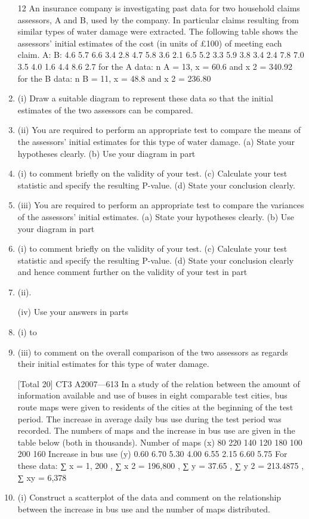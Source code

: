 \documentclass[a4paper,12pt]{article}
\begin{document}
\begin{enumerate}


12
An insurance company is investigating past data for two household claims assessors,
A and B, used by the company. In particular claims resulting from similar types of
water damage were extracted. The following table shows the assessors’ initial
estimates of the cost (in units of £100) of meeting each claim.
A:
B:
4.6
5.7
6.6
3.4
2.8
4.7
5.8
3.6
2.1
6.5
5.2
3.3
5.9
3.8
3.4
2.4
7.8
7.0
3.5
4.0
1.6
4.4
8.6
2.7
for the A data: n A = 13, \sum x = 60.6 and \sum x 2 = 340.92
for the B data: n B = 11, \sum x = 48.8 and \sum x 2 = 236.80
\item (i) Draw a suitable diagram to represent these data so that the initial estimates of
the two assessors can be compared.

\item (ii) You are required to perform an appropriate test to compare the means of the
assessors’ initial estimates for this type of water damage.
(a) State your hypotheses clearly.
(b) Use your diagram in part \item (i) to comment briefly on the validity of your
test.
(c) Calculate your test statistic and specify the resulting P-value.
(d) State your conclusion clearly.
\item (iii)
You are required to perform an appropriate test to compare the variances of
the assessors’ initial estimates.
(a) State your hypotheses clearly.
(b) Use your diagram in part \item (i) to comment briefly on the validity of your
test.
(c) Calculate your test statistic and specify the resulting P-value.
(d) State your conclusion clearly and hence comment further on the validity of your test in part \item (ii).

(iv)
Use your answers in parts \item (i) to \item (iii) to comment on the overall comparison of the two assessors as regards their initial estimates for this type of water damage.

[Total 20]
CT3 A2007—613
In a study of the relation between the amount of information available and use of
buses in eight comparable test cities, bus route maps were given to residents of the cities at the beginning of the test period. The increase in average daily bus use during the test period was recorded. The numbers of maps and the increase in bus use are
given in the table below (both in thousands).
Number of maps (x)
80 220 140 120 180 100 200 160
Increase in bus use (y) 0.60 6.70 5.30 4.00 6.55 2.15 6.60 5.75
For these data:
∑ x = 1, 200 , ∑ x 2 = 196,800 , ∑ y = 37.65 , ∑ y 2 = 213.4875 , ∑ xy = 6,378
\item (i) Construct a scatterplot of the data and comment on the relationship between the increase in bus use and the number of maps distributed.


\end{enumerate}
\end{document}
